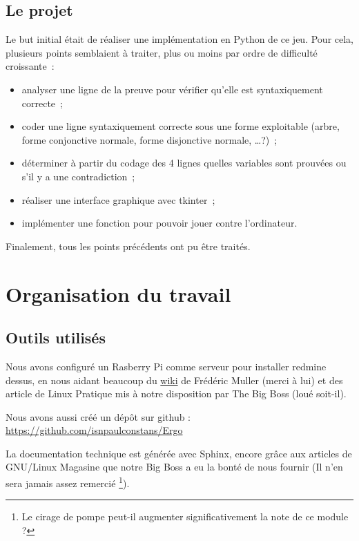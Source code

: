\documentclass[12pt, a4paper]{article}
\begin{document}
\subsection{Le projet}

Le but initial était de réaliser une implémentation en Python de ce jeu. Pour cela, plusieurs points semblaient à traiter, plus ou moins par ordre de difficulté croissante~:
\nopagebreak
\begin{itemize}
\item analyser une ligne de la preuve pour vérifier qu'elle est syntaxiquement correcte~;
\item coder une ligne syntaxiquement correcte sous une forme exploitable (arbre, forme conjonctive normale, forme disjonctive normale, \dots ?)~;
\item déterminer à partir du codage des 4 lignes quelles variables sont prouvées ou s'il y a une contradiction~;
\item réaliser une interface graphique avec tkinter~;
\item implémenter une fonction pour pouvoir jouer contre l'ordinateur.
\end{itemize}

Finalement, tous les points précédents ont pu être traités.



\section{Organisation du travail}

\subsection{Outils utilisés}

Nous avons configuré un Rasberry Pi comme serveur pour installer redmine dessus, en nous aidant beaucoup du \href{http://juramaths.fr/redmine/projects/serveur-web-sur-un-raspberry-pi/wiki}{wiki} de Frédéric Muller (merci à lui) et des article de Linux Pratique mis à notre disposition par The Big Boss (loué soit-il).

Nous avons aussi créé un dépôt sur github : \url{https://github.com/isnpaulconstans/Ergo}

La documentation technique est générée avec Sphinx, encore grâce aux articles de GNU/Linux Magasine que notre Big Boss a eu la bonté de nous fournir (Il n'en sera jamais assez remercié \footnote{Le cirage de pompe peut-il augmenter significativement la note de ce module ?}).
\end{document}
